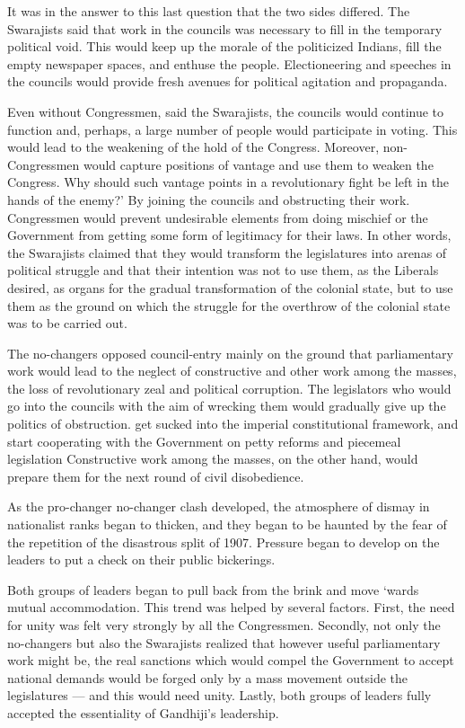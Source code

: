 \begin{multicols}{2}
It was in the answer to this last question that the two sides differed. The Swarajists said that work in the councils was necessary to fill in the temporary political void. This would keep up the morale of the politicized Indians, fill the empty newspaper spaces, and enthuse the people. Electioneering and speeches in the councils would provide fresh avenues for political agitation and propaganda.

Even without Congressmen, said the Swarajists, the councils would continue to function and, perhaps, a large number of people would participate in voting. This would lead to the weakening of the hold of the Congress. Moreover, non- Congressmen would capture positions of vantage and use them to weaken the Congress. Why should such vantage points in a revolutionary fight be left in the hands of the enemy?' By joining the councils and obstructing their work. Congressmen would prevent undesirable elements from doing mischief or the Government from getting some form of legitimacy for their laws. In other words, the Swarajists claimed that they would transform the legislatures into arenas of political struggle and that their intention was not to use them, as the Liberals desired, as organs for the gradual transformation of the colonial state, but to use them as the ground on which the struggle for the overthrow of the colonial state was to be carried out.

The no-changers opposed council-entry mainly on the ground that parliamentary work would lead to the neglect of constructive and other work among the masses, the loss of revolutionary zeal and political corruption. The legislators who would go into the councils with the aim of wrecking them would gradually give up the politics of obstruction. get sucked into the imperial constitutional framework, and start cooperating with the Government on petty reforms and piecemeal legislation Constructive work among the masses, on the other hand, would prepare them for the next round of civil disobedience.

As the pro-changer no-changer clash developed, the atmosphere of dismay in nationalist ranks began to thicken, and they began to be haunted by the fear of the repetition of the disastrous split of 1907. Pressure began to develop on the leaders to put a check on their public bickerings.

Both groups of leaders began to pull back from the brink and move `wards mutual accommodation. This trend was helped by several factors. First, the need for unity was felt very strongly by all the Congressmen. Secondly, not only the no-changers but also the Swarajists realized that however useful parliamentary work might be, the real sanctions which would compel the Government to accept national demands would be forged only by a mass movement outside the legislatures --- and this would need unity. Lastly, both groups of leaders fully accepted the essentiality of Gandhiji's leadership.


\end{multicols}
